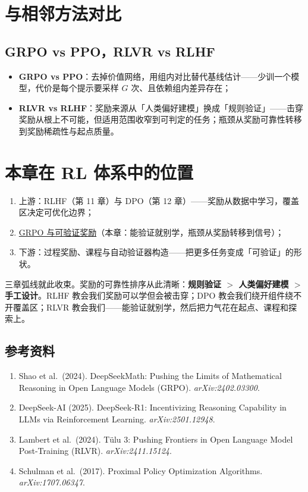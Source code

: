 \documentclass{article}
\begin{document}
\section*{与相邻方法对比}

\subsection*{GRPO vs PPO，RLVR vs RLHF}

\begin{itemize}
  \item \textbf{GRPO vs PPO}：去掉价值网络，用组内对比替代基线估计——少训一个模型，代价是每个提示要采样 $G$ 次、且依赖组内差异存在；
  \item \textbf{RLVR vs RLHF}：奖励来源从「人类偏好建模」换成「规则验证」——击穿奖励从根上不可能，但适用范围收窄到可判定的任务；瓶颈从奖励可靠性转移到奖励稀疏性与起点质量。
\end{itemize}

\section*{本章在 RL 体系中的位置}

\begin{enumerate}
  \item 上游：RLHF（第 11 章）与 DPO（第 12 章）——奖励从数据中学习，覆盖区决定可优化边界；
  \item \underline{GRPO 与可验证奖励}（本章：能验证就别学，瓶颈从奖励转移到信号）；
  \item 下游：过程奖励、课程与自动验证器构造——把更多任务变成「可验证」的形状。
\end{enumerate}

三章弧线就此收束。奖励的可靠性排序从此清晰：\textbf{规则验证 $>$ 人类偏好建模 $>$ 手工设计}。RLHF 教会我们奖励可以学但会被击穿；DPO 教会我们绕开组件绕不开覆盖区；RLVR 教会我们——能验证就别学，然后把力气花在起点、课程和探索上。

\subsection*{参考资料}

\begin{enumerate}
  \item Shao et al.\ (2024). DeepSeekMath: Pushing the Limits of Mathematical Reasoning in Open Language Models (GRPO). \textit{arXiv:2402.03300}.
  \item DeepSeek-AI (2025). DeepSeek-R1: Incentivizing Reasoning Capability in LLMs via Reinforcement Learning. \textit{arXiv:2501.12948}.
  \item Lambert et al.\ (2024). T\"ulu 3: Pushing Frontiers in Open Language Model Post-Training (RLVR). \textit{arXiv:2411.15124}.
  \item Schulman et al.\ (2017). Proximal Policy Optimization Algorithms. \textit{arXiv:1707.06347}.
\end{enumerate}
\end{document}
